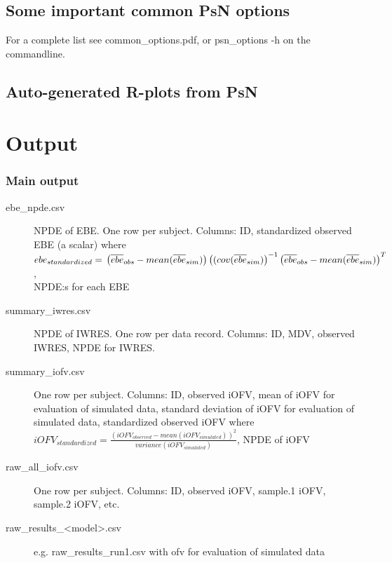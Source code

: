 \subsection{Some important common PsN options}
For a complete list see common\_options.pdf, 
or psn\_options -h on the commandline.


\subsection{Auto-generated R-plots from PsN}
\newcommand{\rplotsconditions}{The default ebe\_npde template 
requires that library PerformanceAnalytics is installed.
If the conditions are not fulfilled then no pdf will be generated,
see the .Rout file in the main run directory for error messages.}



\section{Output}

\subsubsection*{Main output}
\begin{description}
\item[ebe\_npde.csv] NPDE of EBE. One row per subject. Columns: ID,
standardized observed EBE (a scalar) where 
$ebe_{standardized}= \\
\left(\overline{ebe}_{obs} - mean (\overline{ebe}_{sim})\right)\left((cov(\overline{ebe}_{sim})\right)^{-1}
\left(\overline{ebe}_{obs} - mean (\overline{ebe}_{sim})\right)^T$,\\ 
NPDE:s for each EBE
\item[summary\_iwres.csv] NPDE of IWRES. One row per data record. Columns: ID, MDV, observed IWRES, NPDE for IWRES.
\item[summary\_iofv.csv] One row per subject. Columns: ID, observed iOFV,
mean of iOFV for evaluation of simulated data,
standard deviation of iOFV for evaluation of simulated data,
standardized observed iOFV where
$iOFV_{standardized}=\frac{(iOFV_{observed} - mean (iOFV_{simulated}))^2}{variance(iOFV_{simulated})}$, NPDE of iOFV
\item[raw\_all\_iofv.csv] One row per subject. Columns: ID, observed iOFV, sample.1 iOFV, sample.2 iOFV, etc. 
\item[raw\_results\_<model>.csv] e.g. raw\_results\_run1.csv with ofv for evaluation of simulated data
\end{description}

